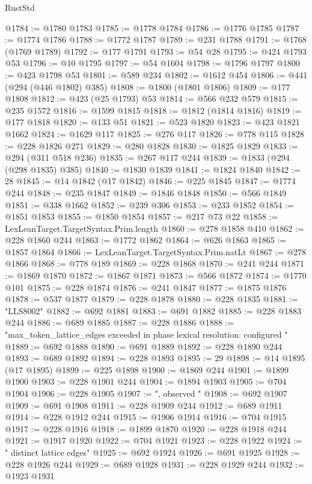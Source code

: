 \begin{lexlean}{RustStd}
\begin{coremodule}
@1784 := @1780 @1783
@1785 := @1778 @1784
@1786 := @1776 @1785
@1787 := @1774 @1786
@1788 := @1772 @1787
@1789 := @231 @1788
@1791 := @1768 (@1769 @1789)
@1792 := @177 @1791
@1793 := @54 @28
@1795 := @424 @1793 @53
@1796 := @10 @1795
@1797 := @54 @1604
@1798 := @1796 @1797
@1800 := @423 @1798 @53
@1801 := @589 @234
@1802 := @1612 @454
@1806 := @441 (@294 (@446 @1802) @385)
@1808 := @1800 (@1801 @1806)
@1809 := @177 @1808
@1812 := @423 (@25 @1793) @53
@1814 := @566 @232 @579
@1815 := @235 @1572
@1816 := @1599 @1815
@1818 := @1812 (@1814 @1816)
@1819 := @177 @1818
@1820 := @133 @51
@1821 := @523 @1820
@1823 := @423 @1821 @1662
@1824 := @1629 @117
@1825 := @276 @117
@1826 := @778 @115
@1828 := @228 @1826 @271
@1829 := @280 @1828
@1830 := @1825 @1829
@1833 := @294 (@311 @518 @236)
@1835 := @267 @117 @244
@1839 := @1833 (@294 (@298 @1835) @385)
@1840 := @1830 @1839
@1841 := @1824 @1840
@1842 := 28
@1845 := @14 @1842 (@17 @1842)
@1846 := @225 @1845
@1847 := @1774 @244
@1848 := @235 @1847
@1849 := @1846 @1848
@1850 := @566 @1849
@1851 := @338 @1662
@1852 := @239 @306
@1853 := @233 @1852
@1854 := @1851 @1853
@1855 := @1850 @1854
@1857 := @217 @73 @22
@1858 := LexLeanTarget.TargetSyntax.Prim.length
@1860 := @278 @1858 @410
@1862 := @228 @1860 @244
@1863 := @1772 @1862
@1864 := @626 @1863
@1865 := @1857 @1864
@1866 := LexLeanTarget.TargetSyntax.Prim.natLt
@1867 := @278 @1866
@1868 := @778 @189
@1869 := @228 @1868
@1870 := @241 @244
@1871 := @1869 @1870
@1872 := @1867 @1871
@1873 := @566 @1872
@1874 := @1770 @101
@1875 := @228 @1874
@1876 := @241 @1847
@1877 := @1875 @1876
@1878 := @537 @1877
@1879 := @228 @1878
@1880 := @228 @1835
@1881 := "LLS8002"
@1882 := @692 @1881
@1883 := @691 @1882
@1885 := @228 @1883 @244
@1886 := @689 @1885
@1887 := @228 @1886
@1888 := "max_token_lattice_edges exceeded in phase lexical resolution: configured "
@1889 := @692 @1888
@1890 := @691 @1889
@1892 := @228 @1890 @244
@1893 := @689 @1892
@1894 := @228 @1893
@1895 := 29
@1898 := @14 @1895 (@17 @1895)
@1899 := @225 @1898
@1900 := @1869 @244
@1901 := @1899 @1900
@1903 := @228 @1901 @244
@1904 := @1894 @1903
@1905 := @704 @1904
@1906 := @228 @1905
@1907 := ", observed "
@1908 := @692 @1907
@1909 := @691 @1908
@1911 := @228 @1909 @244
@1912 := @689 @1911
@1914 := @228 @1912 @244
@1915 := @1906 @1914
@1916 := @704 @1915
@1917 := @228 @1916
@1918 := @1899 @1870
@1920 := @228 @1918 @244
@1921 := @1917 @1920
@1922 := @704 @1921
@1923 := @228 @1922
@1924 := " distinct lattice edges"
@1925 := @692 @1924
@1926 := @691 @1925
@1928 := @228 @1926 @244
@1929 := @689 @1928
@1931 := @228 @1929 @244
@1932 := @1923 @1931

\end{coremodule}
\end{lexlean}

